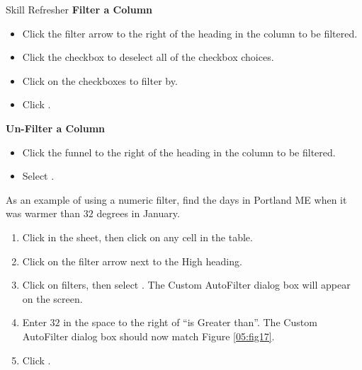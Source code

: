 \begin{center}
	\begin{sklbox}{Skill Refresher}
		\textbf{Filter a Column}
		\\
		\begin{itemize}
			\setlength{\itemsep}{0pt}
			\setlength{\parskip}{0pt}
			\setlength{\parsep}{0pt}

			\item Click the filter arrow to the right of the heading in the column to be filtered.
			\item Click the  checkbox to deselect all of the checkbox choices.
			\item Click on the checkboxes to filter by.
			\item Click .
			
		\end{itemize}
		
		\bigskip
		\textbf{Un-Filter a Column}
		
		\begin{itemize}
			\setlength{\itemsep}{0pt}
			\setlength{\parskip}{0pt}
			\setlength{\parsep}{0pt}
			
			\item Click the funnel to the right of the heading in the column to be filtered.
			\item Select .
			
		\end{itemize}
	\end{sklbox}
\end{center}

As an example of using a numeric filter, find the days in Portland ME when it was warmer than $ 32 $ degrees in January.

\begin{enumerate}
	\item Click in the  sheet, then click on any cell in the table.
	\item Click on the filter arrow next to the High heading.
	\item Click on  filters, then select . The Custom AutoFilter dialog box will appear on the screen.
	\item Enter $ 32 $ in the space to the right of ``is Greater than''. The Custom AutoFilter dialog box should now match Figure \ref{05:fig17}.
	\item Click .
\end{enumerate}

